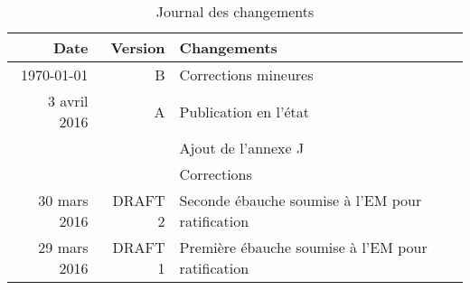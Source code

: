 
%

\begin{table}[h]

	\centering
	
	\begin{tabular}{rrl}
		\toprule
		\textbf{Date} & \textbf{Version} & \textbf{Changements}\\
		\midrule
		
		
		\today{} & B & Corrections mineures\\
		
		3 avril 2016 & A & Publication en l'état\\
		
		&&Ajout de l'annexe J\\
		&&Corrections\\
		
		30 mars 2016 & DRAFT 2 & Seconde ébauche soumise à l'EM pour ratification\\
		
		29 mars 2016 & DRAFT 1 & Première ébauche soumise à l'EM pour ratification\\
		\bottomrule
	\end{tabular}

	\caption[Changements]{Journal des changements}

	\label{record-of-changes}

\end{table} 